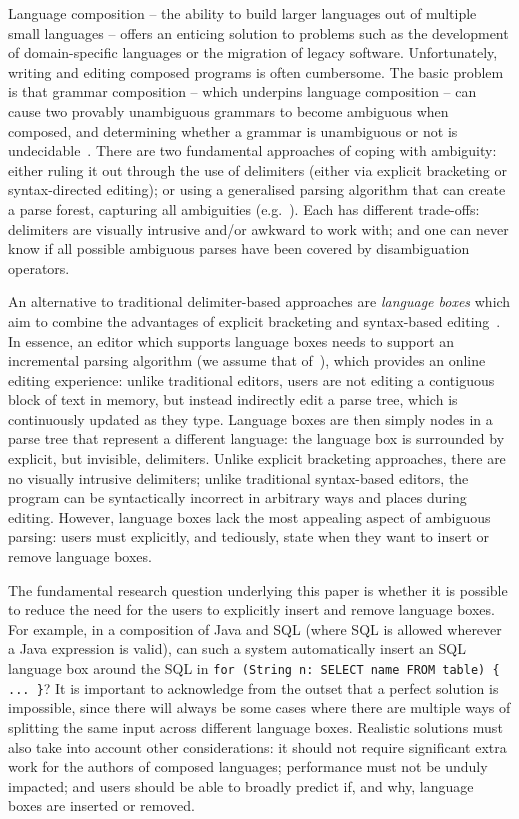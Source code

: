 \documentclass[sigplan,screen]{acmart}\settopmatter{printfolios=true,printccs=false,printacmref=false}
\begin{document}
Language composition -- the ability to build larger languages out of multiple
small languages -- offers an enticing solution to problems such as the
development of domain-specific languages or the migration of legacy software.
Unfortunately, writing and editing composed programs is often cumbersome.
The basic problem is that grammar
composition -- which underpins language composition -- can cause
two provably unambiguous grammars to become ambiguous when composed,
and determining whether a grammar is unambiguous or not is
undecidable~\cite{cantor62ambiguity}. There are two fundamental approaches
of coping with ambiguity: either ruling it out through the use of
delimiters (either via explicit bracketing or syntax-directed
editing); or using a generalised parsing algorithm that can create a parse
forest, capturing all ambiguities
(e.g.~\cite{visser97scannerless}). Each has different trade-offs: delimiters
are visually intrusive and/or awkward to work with; and one can never know if all possible
ambiguous parses have been covered by disambiguation operators.

An alternative to traditional delimiter-based approaches are \emph{language boxes} which aim to
combine the advantages of explicit bracketing and syntax-based
editing~\cite{diekmann14eco}. In essence, an editor
which supports language boxes needs to support an incremental parsing algorithm
(we assume that of~\citet{wagner98practicalalgorithms}), which provides an
online editing experience: unlike traditional editors, users are not editing
a contiguous block of text in memory, but instead
indirectly edit a parse tree, which is continuously updated as they type.
Language boxes are then simply nodes in a parse
tree that represent a different language: the language box is surrounded by
explicit, but invisible, delimiters. Unlike explicit bracketing approaches,
there are no visually intrusive delimiters; unlike traditional
syntax-based editors, the program can be syntactically incorrect in arbitrary
ways and places during editing. However, language boxes lack the most appealing aspect of
ambiguous parsing: users must explicitly, and tediously, state when they want
to insert or remove language boxes.

The fundamental research question underlying this paper is whether it is
possible to reduce the need for the users to explicitly insert and remove language
boxes. For example, in a composition of Java and SQL (where SQL is allowed
wherever a Java expression is valid), can such a system automatically insert an
SQL language box around the SQL in \texttt{for (String n: SELECT name FROM table) \{ ...
\}}? It is important to acknowledge from the outset that a perfect solution
is impossible, since there will always be some cases where there are multiple
ways of splitting the same input across different language boxes. Realistic
solutions must also take into account other considerations: it should not
require significant extra work for the authors of composed languages; performance must
not be unduly impacted; and users should be able to broadly predict if, and
why, language boxes are inserted or removed.
\end{document}

